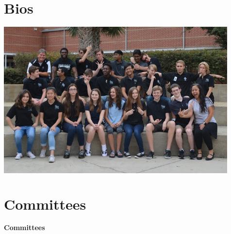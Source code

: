 \documentclass[
letterpaper, %
11pt, %
onecolumn, %
openany, %
]{report}
\begin{document}
\cleardoublepage
\chapter{Bios}
\vspace{3em}
\begin{minipage}[c]{\linewidth}
\centering
\includegraphics[width=\linewidth]{Images/Team/Team_Bios.PNG}
\end{minipage}





%







% 
% 


 
% 
% 
% 





                                                    
\cleardoublepage
\chapter*{Committees} 
\pagestyle{plain}
\noindent\textbf{\Huge Committees}
\newline
\end{document}
